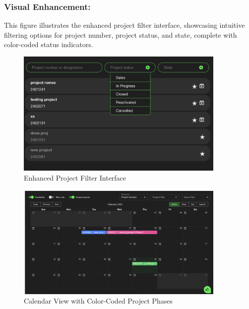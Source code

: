 \subsubsection{Visual Enhancement:}
This figure illustrates the enhanced project filter interface, showcasing intuitive filtering options for project number, project status, and state, complete with color-coded status indicators.

\begin{figure}[H]
    \centering
    \includegraphics[width=0.9\textwidth]{src/assets/chapters/enhanced-project-filter-interface.png}
    \caption{ Enhanced Project Filter Interface}
    \label{fig:enhanced_project_filter_interface}
\end{figure}

\begin{figure}[H]
    \centering
    \includegraphics[width=0.9\textwidth]{src/assets/chapters/calendar1.png}
    \caption{Calendar View with Color-Coded Project Phases}
    \label{fig:calendar_view_color_coded}
\end{figure}

